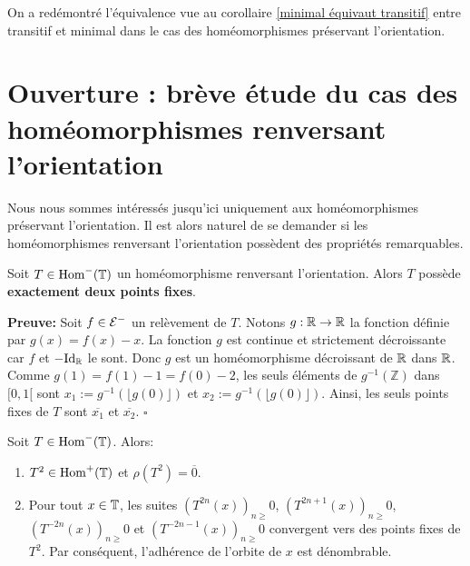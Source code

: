	\begin{rmq}
		On a redémontré l'équivalence vue au corollaire \ref{minimal équivaut transitif} entre transitif et minimal dans le cas des homéomorphismes préservant l'orientation.
	\end{rmq}












\section{Ouverture : brève étude du cas des homéomorphismes renversant l'orientation}
	Nous nous sommes intéressés jusqu'ici uniquement aux homéomorphismes préservant l'orientation. Il est alors naturel de se demander si les homéomorphismes renversant l'orientation possèdent des propriétés remarquables.\\


\begin{proposition}
		Soit $T\in \mathrm{Hom}^-({\mathbb{T}})$ un homéomorphisme renversant l'orientation. Alors $T$ possède \textbf{exactement deux points fixes}.
\end{proposition}

	\textbf{Preuve:}
	Soit $f \in {\mathcal{E}}^-$ un relèvement de $T$. Notons $g: {\mathbb{R}} \to {\mathbb{R}}$ la fonction définie par $g(x)=f(x)-x$. La fonction $g$ est continue et strictement décroissante car $f$ et $-\mathrm{Id}_{{\mathbb{R}}}$ le sont. Donc $g$ est un homéomorphisme décroissant de ${\mathbb{R}}$ dans ${\mathbb{R}}$. Comme $g(1)=f(1)-1=f(0)-2$, les seuls éléments de $g^{-1}(\mathbb{Z})$ dans $[0,1[$ sont $x_1:=g^{-1}(\lfloor g(0) \rfloor)$ et $x_2:=g^{-1}(\lfloor g(0) \rfloor)$. Ainsi, les seuls points fixes de $T$ sont $\overline{x_1}$ et $\overline{x_2}$. \hfill $\square$\\





\begin{corollary}
	Soit $T \in \mathrm{Hom}^-({\mathbb{T}})$. Alors:
	\begin{enumerate}
		\item $T^2 \in \mathrm{Hom}^+({\mathbb{T}})$ et $\rho(T^2)=\overline{0}$.
		\item Pour tout $x \in {\mathbb{T}}$, les suites $(T^{2n}(x))_{n\geq}0$, $(T^{2n+1}(x))_{n\geq}0$, $(T^{-2n}(x))_{n\geq}0$ et $(T^{-2n-1}(x))_{n\geq}0$ convergent vers des points fixes de $T^2$. Par conséquent, l'adhérence de l'orbite de $x$ est dénombrable.
	\end{enumerate}
\end{corollary}







